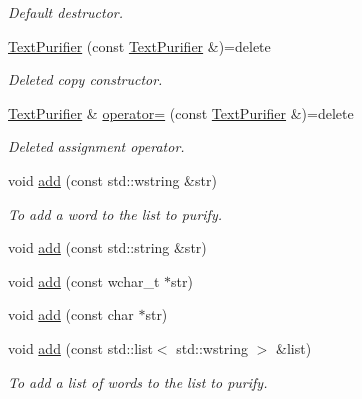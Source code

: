 \begin{DoxyCompactItemize}
\begin{DoxyCompactList}\small\item\em Default destructor. \end{DoxyCompactList}\item 
\mbox{\label{classlakoo_1_1_text_purifier_add5390a74c2764b2970817ee919bf467}} 
\hyperlink{classlakoo_1_1_text_purifier_add5390a74c2764b2970817ee919bf467}{Text\+Purifier} (const \hyperlink{classlakoo_1_1_text_purifier}{Text\+Purifier} \&)=delete
\begin{DoxyCompactList}\small\item\em Deleted copy constructor. \end{DoxyCompactList}\item 
\mbox{\label{classlakoo_1_1_text_purifier_ae75b6ea7db94bea2c8326a929a436aae}} 
\hyperlink{classlakoo_1_1_text_purifier}{Text\+Purifier} \& \hyperlink{classlakoo_1_1_text_purifier_ae75b6ea7db94bea2c8326a929a436aae}{operator=} (const \hyperlink{classlakoo_1_1_text_purifier}{Text\+Purifier} \&)=delete
\begin{DoxyCompactList}\small\item\em Deleted assignment operator. \end{DoxyCompactList}\item 
void \hyperlink{classlakoo_1_1_text_purifier_ae2279e22ee6470d3e0a0deb1b58e35f2}{add} (const std\+::wstring \&str)
\begin{DoxyCompactList}\small\item\em To add a word to the list to purify. \end{DoxyCompactList}\item 
void \hyperlink{classlakoo_1_1_text_purifier_a7a898c7d01f97ed6a275d2b6cf631746}{add} (const std\+::string \&str)
\item 
void \hyperlink{classlakoo_1_1_text_purifier_ae8d3ed1b3f6b05bc5e0a103e60200f86}{add} (const wchar\+\_\+t $\ast$str)
\item 
void \hyperlink{classlakoo_1_1_text_purifier_ad035c47d9d3ab94a38aeb46602ae2cc4}{add} (const char $\ast$str)
\item 
void \hyperlink{classlakoo_1_1_text_purifier_a2f8d0c108599b5731424d5bfef6e4c00}{add} (const std\+::list$<$ std\+::wstring $>$ \&list)
\begin{DoxyCompactList}\small\item\em To add a list of words to the list to purify. \end{DoxyCompactList}\item 

\end{DoxyCompactItemize}
